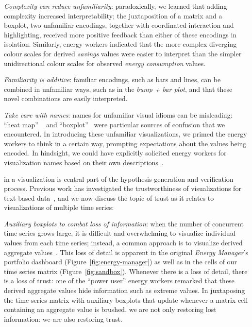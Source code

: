 \documentclass[journal]{vgtc}                %
\newcommand{\bqstart}[1]{\vspace{1mm} \noindent{\textbf{#1}}}
\begin{document}
{\it Complexity can reduce unfamiliarity}: paradoxically, we learned that adding complexity increased interpretability; the juxtaposition of a matrix and a boxplot, two unfamiliar encodings, together with coordinated interaction and highlighting, received more positive feedback than either of these encodings in isolation.
Similarly, energy workers indicated that the more complex diverging colour scales for derived {\it savings} values were easier to interpret than the simpler unidirectional colour scales for observed {\it energy consumption} values. %

{\it Familiarity is additive}: familiar encodings, such as bars and lines, can be combined in unfamiliar ways, such as in the {\it bump + bar plot}, and that these novel combinations are easily interpreted.

{\it Take care with names}: names for unfamiliar visual idioms can be misleading: ``heat map'' ~\cite{Field2015,Wilkinson2009} and ``boxplot''~\cite{Wickham2011} were particular sources of confusion that we encountered.
In introducing these unfamiliar visualizations, we primed the energy workers to think in a certain way, prompting expectations about the values being encoded. 
In hindsight, we could have explicitly solicited energy workers for visualization names based on their own descriptions~\cite{Metoyer2012}.

\bqstart{Trust} in a visualization is central part of the hypothesis generation and verification process. 
Previous work has investigated the trustworthiness of visualizations for text-based data~\cite{Chuang2012}, and we now discuss the topic of trust as it relates to visualizations of multiple time series:

{\it Auxiliary boxplots to combat loss of information}: when the number of concurrent time series grows large, it is difficult and overwhelming to visualize individual values from each time series; instead, a common approach is to visualize derived aggregate values~\cite{McLachlan2008}.
This loss of detail is apparent in the original {\it Energy Manager}'s portfolio dashboard (Figure~\ref{fig:energy-manager}) as well as in the cells of our time series matrix (Figure~\ref{fig:sandbox}).
Whenever there is a loss of detail, there is a loss of trust: one of the ``power user'' energy workers remarked that these derived aggregate values hide information such as extreme values.
In juxtaposing the time series matrix with auxiliary boxplots that update whenever a matrix cell containing an aggregate value is brushed,  we are not only restoring lost information: we are also restoring trust.
\end{document}
